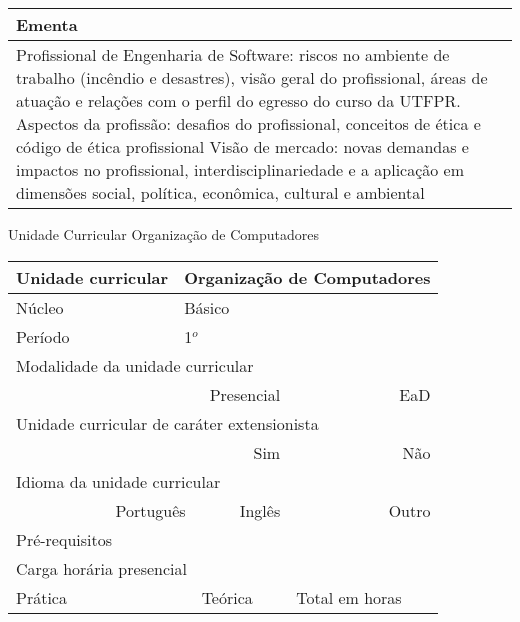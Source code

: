 \begin{quadro}[ht!]
\begin{tabular}{|p{3cm} p{2cm} p{3cm} p{2cm} p{3cm} p{2cm}|}
\multicolumn{6}{|p{15cm}|}{\cellcolor{blue1} Ementa} \\\hline
\hline\multicolumn{6}{|p{15cm}|}{\scriptsize Profissional de Engenharia de Software: riscos no ambiente de trabalho (incêndio e desastres), visão geral do profissional, áreas de atuação e relações com o perfil do egresso do curso da UTFPR. Aspectos da profissão: desafios do profissional, conceitos de ética e código de ética profissional Visão de mercado: novas demandas e impactos no profissional, interdisciplinariedade e a aplicação em dimensões social, política, econômica, cultural e ambiental}\\\hline 
\hline
	\end{tabular}
\end{quadro}


\begin{quadro}[ht!]
  \centering\scriptsize
\caption{Unidade Curricular Organização de Computadores}
\begin{tabular}{|p{3cm} p{2cm} p{3cm} p{2cm} p{3cm} p{2cm}|}\hline
\multicolumn{1}{|p{3cm}|}{\cellcolor{blue1} Unidade curricular} & \multicolumn{5}{p{9cm}|}{Organização de Computadores}\\\hline
\multicolumn{1}{|p{3cm}|}{\cellcolor{blue1} Núcleo} & \multicolumn{5}{p{11.5cm}|}{Básico}\\\hline
\multicolumn{1}{|p{3cm}|}{\cellcolor{blue1} Período} & \multicolumn{5}{p{9cm}|}{1$^o$}\\\hline
\multicolumn{6}{|p{15cm}|}{\cellcolor{blue1} Modalidade da unidade curricular} \\\hline
\multicolumn{2}{|r}{		} &  \multicolumn{2}{r}{Presencial \XBox} & \multicolumn{2}{r|}{EaD \Square	} \\\hline
\multicolumn{6}{|p{15cm}|}{\cellcolor{blue1} Unidade curricular de caráter extensionista} \\\hline
\multicolumn{4}{|r}{			Sim \XBox	} & \multicolumn{2}{r|}{	Não \Square	}\\\hline
\multicolumn{6}{|p{15cm}|}{\cellcolor{blue1} Idioma da unidade curricular} \\ \hline
\multicolumn{2}{|r}{	Português \XBox	} &  \multicolumn{2}{r}{	Inglês \Square	} & \multicolumn{2}{r|}{	Outro \Square	} \\ \hline
\multicolumn{1}{|p{3cm}|}{\cellcolor{blue1} Pré-requisitos} & \multicolumn{5}{p{9cm}|}{}\\ \hline
\multicolumn{6}{|p{15cm}|}{\cellcolor{blue1} Carga horária presencial} \\ \hline
\multicolumn{1}{|p{3cm}|}{\raggedleft Prática} & \multicolumn{1}{p{1cm}|}{\centering	15	} &  \multicolumn{1}{p{3cm}|}{\raggedleft Teórica}  & \multicolumn{1}{p{1cm}|}{\centering 	15	} & \multicolumn{1}{p{3cm}|}{\raggedleft Total em horas} & \multicolumn{1}{p{1cm}|}{\raggedleft	30	} \\ \hline 

\end{tabular}
\end{quadro}
